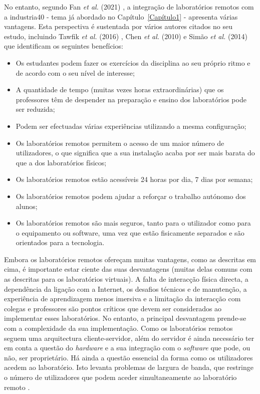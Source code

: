 No entanto, segundo Fan \textit{et al.} (2021) \cite{EvaluationRemoteVirtualE-Learning}, a integração de laboratórios remotos com a \gls{industria40} - tema já abordado no Capítulo~\ref{Capítulo1} - apresenta várias vantagens. Esta perspectiva é sustentada por vários autores citados no seu estudo, incluindo Tawfik \textit{et al.} (2016) \cite{RemoteLabsImpactVISIR}, Chen \textit{et al.} (2010) \cite{DevelopingVirtualAndRemoteUndergraduate} e Simão \textit{et al.} (2014) \cite{RemoteLabsDevelopingCountries} que identificam os seguintes benefícios:
\begin{itemize}
    \item Os estudantes podem fazer os exercícios da disciplina ao seu próprio ritmo e de acordo com o seu nível de interesse;
    \item A quantidade de tempo (muitas vezes horas extraordinárias) que os professores têm de despender na preparação e ensino dos laboratórios pode ser reduzida;
    \item Podem ser efectuadas várias experiências utilizando a mesma configuração;
    \item Os laboratórios remotos permitem o acesso de um maior número de utilizadores, o que significa que a sua instalação acaba por ser mais barata do que a dos laboratórios físicos;
    \item Os laboratórios remotos estão acessíveis 24 horas por dia, 7 dias por semana;
    \item Os laboratórios remotos podem ajudar a reforçar o trabalho autónomo dos alunos;
    \item Os laboratórios remotos são mais seguros, tanto para o utilizador como para o equipamento ou software, uma vez que estão fisicamente separados e são orientados para a tecnologia.
\end{itemize}

Embora os laboratórios remotos ofereçam muitas vantagens, como as descritas em cima, é importante estar ciente das suas desvantagens (muitas delas comuns com as descritas para os laboratórios virtuais). A falta de interacção física directa, a dependência da ligação com a Internet, os desafios técnicos e de manutenção, a experiência de aprendizagem menos imersiva e a limitação da interacção com colegas e professores são pontos críticos que devem ser considerados ao implementar esses laboratórios. No entanto, a principal desvantagem prende-se com a complexidade da sua implementação. Como os laboratórios remotos seguem uma arquitectura cliente-servidor, além do servidor é ainda necessário ter em conta a questão do \textit{hardware} e a sua integração com o \textit{software} que pode, ou não, ser proprietário. Há ainda a questão essencial da forma como os utilizadores acedem ao laboratório. Isto levanta problemas de largura de banda, que restringe o número de utilizadores que podem aceder simultaneamente ao laboratório remoto \cite{HERADIO20161}.

